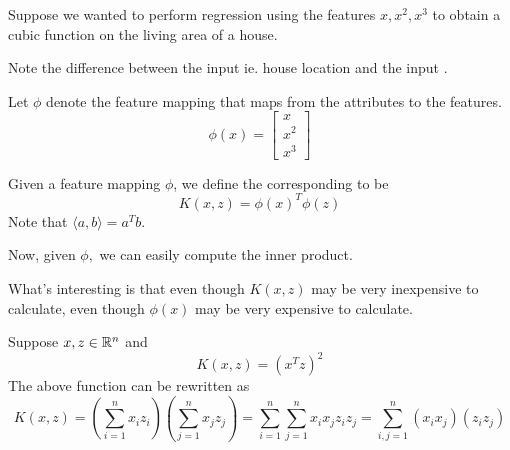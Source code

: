\documentclass[12pt]{scrartcl}
\begin{document}
Suppose we wanted to perform regression using the features $x, x^2, x^3$ to
obtain a cubic function on the living area of a house.
\begin{note}
    Note the difference between the input  ie. house location and the input .
\end{note}
Let $\phi$ denote the feature mapping that maps from the attributes to the features.
\[\phi(x) = \begin{bmatrix}
        x \\ x^2\\x^3
    \end{bmatrix}\]
\begin{definition}
    Given a feature mapping $\phi$, we define the corresponding  to be
    \[K(x, z) = \phi(x)^T\phi(z)\]
    Note that $\langle a, b \rangle = a^Tb$.
\end{definition}
Now, given $\phi,$ we can easily compute the inner product.
\begin{note}
    What's interesting is that even though $K(x, z)$ may be very inexpensive to calculate, even though $\phi(x)$ may be very expensive to calculate.
\end{note}
\begin{example}
    Suppose $x, z \in \mathbb R^n$ and
    \[K(x, z) = (x^Tz)^2\]
    The above function can be rewritten as
    \[K(x, z) = (\sum_{i=1}^n x_iz_i)(\sum_{j=1}^nx_jz_j) =  \sum_{i=1}^n\sum_{j=1}^nx_ix_jz_iz_j = \sum_{i, j = 1}^n (x_ix_j)(z_iz_j)\]
\end{example}




\end{document}

